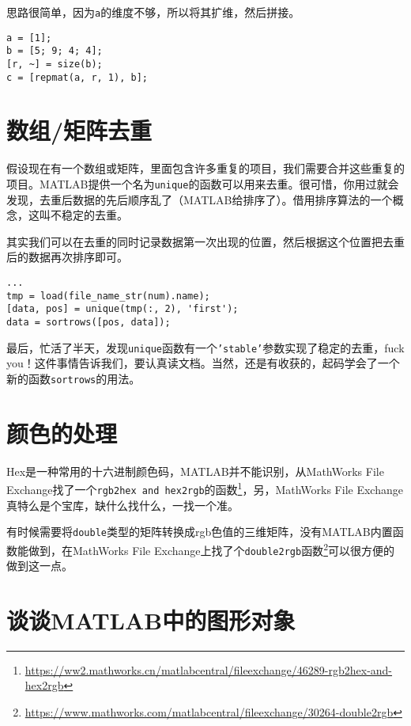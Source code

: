 思路很简单，因为\texttt{a}的维度不够，所以将其扩维，然后拼接。

\begin{verbatim}
a = [1];
b = [5; 9; 4; 4];
[r, ~] = size(b);
c = [repmat(a, r, 1), b];
\end{verbatim}

\section{数组/矩阵去重}

假设现在有一个数组或矩阵，里面包含许多重复的项目，我们需要合并这些重复的项目。MATLAB提供一个名为\texttt{unique}的函数可以用来去重。很可惜，你用过就会发现，去重后数据的先后顺序乱了（MATLAB给排序了）。借用排序算法的一个概念，这叫不稳定的去重。

其实我们可以在去重的同时记录数据第一次出现的位置，然后根据这个位置把去重后的数据再次排序即可。

\begin{verbatim}
...
tmp = load(file_name_str(num).name);
[data, pos] = unique(tmp(:, 2), 'first');
data = sortrows([pos, data]);
\end{verbatim}

最后，忙活了半天，发现\texttt{unique}函数有一个\texttt{'stable'}参数实现了稳定的去重，fuck you！这件事情告诉我们，要认真读文档。当然，还是有收获的，起码学会了一个新的函数\texttt{sortrows}的用法。


\section{颜色的处理}

Hex是一种常用的十六进制颜色码，MATLAB并不能识别，从MathWorks File Exchange找了一个\texttt{rgb2hex and hex2rgb}的函数\footnote{\url{https://ww2.mathworks.cn/matlabcentral/fileexchange/46289-rgb2hex-and-hex2rgb}}，另，MathWorks File Exchange真特么是个宝库，缺什么找什么，一找一个准。

有时候需要将\texttt{double}类型的矩阵转换成rgb色值的三维矩阵，没有MATLAB内置函数能做到，在MathWorks File Exchange上找了个\texttt{double2rgb}函数\footnote{\url{https://www.mathworks.com/matlabcentral/fileexchange/30264-double2rgb}}可以很方便的做到这一点。

\section{谈谈MATLAB中的图形对象}

